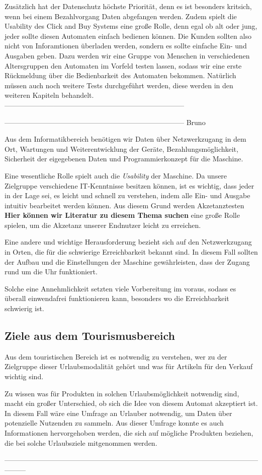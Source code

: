 Zusätzlich hat der Datenschutz höchste Priorität, denn es ist besonders kritsich, wenn bei einem Bezahlvorgang 
Daten abgefangen werden. 
Zudem spielt die Usability des Click and Buy Systems eine große Rolle, denn egal ob alt oder jung, 
jeder sollte diesen Automaten einfach bedienen können. Die Kunden sollten also nicht von Inforamtionen überladen werden, 
sondern es sollte einfache Ein- und Ausgaben geben. Dazu werden wir eine Gruppe von Menschen in verschiedenen Altersgruppen 
den Automaten im Vorfeld testen lassen, sodass wir eine erste Rückmeldung über die Bedienbarkeit des Automaten bekommen.
Natürlich müssen auch noch weitere Tests durchgeführt werden, diese werden in den weiteren Kapiteln behandelt.
-----------------------------------------------------------------------------


----------------------------------------------------------------------------- Bruno

Aus dem Informatikbereich benötigen wir Daten über Netzwerkzugang in dem Ort, Wartungen und Weiterentwicklung der 
Geräte, Bezahlungsmöglichkeit, Sicherheit der eigegebenen Daten und Programmierkonzept für die Maschine.


Eine wesentliche Rolle spielt auch die \textit{Usability} der Maschine. Da unsere Zielgruppe verschiedene IT-Kenntnisse
besitzen können, ist es wichtig, dass jeder in der Lage sei, es leicht und schnell zu verstehen, indem alle Ein- und
Ausgabe intuitiv bearbeitet werden können. Aus diesem Grund werden Akzetanztesten \textbf{Hier können wir 
Literatur zu diesem Thema suchen} eine große Rolle spielen, um die Akzetanz unserer Endnutzer leicht zu erreichen. 


Eine andere und wichtige Herausforderung bezieht sich auf den Netzwerkzugang in Orten, die für die schwierige 
Erreichbarkeit bekannt sind. In diesem Fall sollten der Aufbau und die Einstellungen der Maschine gewährleisten,
 dass der Zugang rund um die Uhr funktioniert.


Solche eine Annehmlichkeit setzten viele Vorbereitung im voraus, sodass es überall einwendafrei funktionieren kann,
besonders wo die Erreichbarkeit schwierig ist. 


\subsection{Ziele aus dem Tourismusbereich}


Aus dem touristischen Bereich ist es notwendig zu verstehen, wer zu der Zielgruppe dieser Urlaubsmodalität gehört
und was für Artikeln für den Verkauf wichtig sind.


Zu wissen was für Produkten in solchen Urlaubsmöglichkeit notwendig sind, macht ein großer Unterschied, ob sich die
Idee von diesem Automat akzeptiert ist. In diesem Fall wäre eine Umfrage an Urlauber notwendig, um Daten über 
potenzielle Nutzenden zu sammeln. Aus dieser Umfrage konnte es auch Informationen hervorgehoben werden, die sich auf
mögliche Produkten beziehen, die bei solche Urlaubsziele mitgenommen werden.

---------------------------------------------------------------------------------------------------------------------